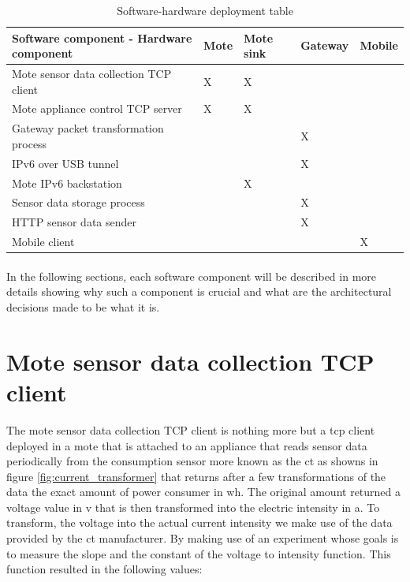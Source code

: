 \documentclass[oneside,12pt,a4paper,final]{book}
\begin{document}
\begin{table}
    \begin{tabular}{lllll}
    		  \hline
    Software component - Hardware component & Mote & Mote sink & Gateway & Mobile \\ \hline
    Mote sensor data collection TCP client  & X    & X         & ~       & ~      \\ 
    Mote appliance control TCP server       & X    & X         & ~       & ~      \\
    Gateway packet transformation process   & ~    & ~         & X       & ~      \\
    IPv6 over USB tunnel                    & ~    & ~         & X       & ~      \\
    Mote IPv6 backstation                   & ~    & X         & ~       & ~      \\
    Sensor data storage process             & ~    & ~         & X       & ~      \\
    HTTP sensor data sender                 & ~    & ~         & X       & ~      \\
    Mobile client                           & ~    & ~         & ~       & X      \\
    \end{tabular}
    \caption{Software-hardware deployment table}
    \label{table:soft_hard_deployment}
\end{table}
\paragraph{}
In the following sections, each software component will be described in more details showing why such a component is crucial and what are the architectural decisions made to be what it is.

\section{Mote sensor data collection TCP client}
The mote sensor data collection TCP client is nothing more but a \gls{tcp} client deployed in a mote that is attached to an appliance that reads sensor data periodically from the consumption sensor more known as the \gls{ct}  as showns in figure \ref{fig:current_transformer} that returns after a few transformations of the data the exact amount of power consumer in \gls{wh}. The original amount returned a voltage value in \gls{v} that is then transformed into the electric intensity in \gls{a}. To transform, the voltage into the actual current intensity we make use of the data provided by the \gls{ct} manufacturer. By making use of an experiment whose goals is to measure the slope and the constant of the voltage to intensity function. This function resulted in the following values:
\end{document}
